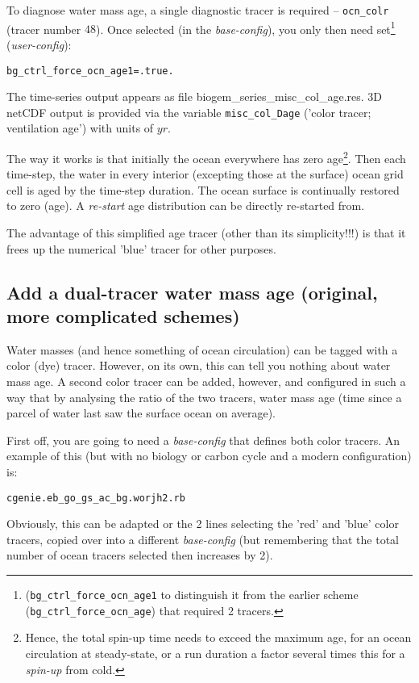 \documentclass[11pt,fleqn]{book} %
\begin{document}
To diagnose water mass age, a single diagnostic tracer is required -- \texttt{ocn\_colr} (tracer number \(48\)). Once selected (in the \textit{base-config}), you only then need set\footnote{(\texttt{bg\_ctrl\_force\_ocn\_age1} to distinguish it from the earlier scheme (\texttt{bg\_ctrl\_force\_ocn\_age}) that required 2 tracers.} (\textit{user-config}):
\vspace{-2pt}\begin{verbatim}
bg_ctrl_force_ocn_age1=.true.
\end{verbatim}\vspace{-2pt}

The time-series output appears as file \textsf{\footnotesize biogem\_series\_misc\_col\_age.res}. 3D netCDF output is provided via the variable \texttt{misc\_col\_Dage} ('color tracer; ventilation age') with units of \(yr\).

The way it works is that initially the ocean everywhere has zero age\footnote{Hence, the total spin-up time needs to exceed the maximum age, for an ocean circulation at steady-state, or a run duration a factor several times this for a \textit{spin-up} from cold.}. Then each time-step, the water in every interior (excepting those at the surface) ocean grid cell is aged by the time-step duration. The ocean surface is continually restored to zero (age). A \textit{re-start} age distribution can be directly re-started from.

The advantage of this simplified age tracer (other than its simplicity!!!) is that it frees up the numerical 'blue' tracer for other purposes.

%
\subsection*{Add a dual-tracer water mass age  (original, more complicated schemes)}
\vspace{1mm}

Water masses (and hence something of ocean circulation) can be tagged with a color (dye) tracer. However, on its own, this can tell you nothing about water mass age. A second color tracer can be added, however, and configured in such a way that by analysing the ratio of the two tracers, water mass age (time since a parcel of water last saw the surface ocean on average).

First off, you are going to need a \textit{base-config} that defines both color tracers. An example of this (but with no biology or carbon cycle and a modern configuration) is:
\vspace{-2pt}\begin{verbatim}
cgenie.eb_go_gs_ac_bg.worjh2.rb
\end{verbatim}\vspace{-2pt}
Obviously, this can be adapted or the 2 lines selecting the 'red' and 'blue' color tracers, copied over into a different \textit{base-config} (but remembering that the total number of ocean tracers selected then increases by 2).
\end{document}
